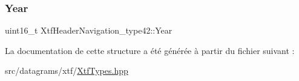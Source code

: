 \subsubsection{\texorpdfstring{Year}{Year}}
{\footnotesize\ttfamily uint16\+\_\+t Xtf\+Header\+Navigation\+\_\+type42\+::\+Year}



La documentation de cette structure a été générée à partir du fichier suivant \+:\begin{DoxyCompactItemize}
\item 
src/datagrams/xtf/\hyperlink{XtfTypes_8hpp}{Xtf\+Types.\+hpp}\end{DoxyCompactItemize}
